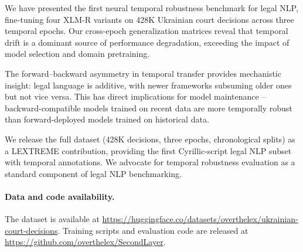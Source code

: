 \documentclass[11pt]{article}
\begin{document}
We have presented the first neural temporal robustness benchmark for legal NLP, fine-tuning four XLM-R variants on 428K Ukrainian court decisions across three temporal epochs. Our cross-epoch generalization matrices reveal that temporal drift is a dominant source of performance degradation, exceeding the impact of model selection and domain pretraining.

The forward--backward asymmetry in temporal transfer provides mechanistic insight: legal language is additive, with newer frameworks subsuming older ones but not vice versa. This has direct implications for model maintenance -- backward-compatible models trained on recent data are more temporally robust than forward-deployed models trained on historical data.

We release the full dataset (428K decisions, three epochs, chronological splits) as a LEXTREME contribution, providing the first Cyrillic-script legal NLP subset with temporal annotations. We advocate for temporal robustness evaluation as a standard component of legal NLP benchmarking.

\paragraph{Data and code availability.}
The dataset is available at \url{https://huggingface.co/datasets/overthelex/ukrainian-court-decisions}. Training scripts and evaluation code are released at \url{https://github.com/overthelex/SecondLayer}.



\end{document}
